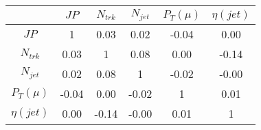 \begin{tabular}{|c|c|c|c|c|c|} 
\hline
 & $JP$ & $N_{trk}$ & $N_{jet}$ & $P_{T} (\mu)$ & $\eta (jet)$ \\ \hline
$JP$ & 1 & 0.03 & 0.02 & -0.04 & 0.00 \\
$N_{trk}$ & 0.03 & 1 & 0.08 & 0.00 & -0.14 \\
$N_{jet}$ & 0.02 & 0.08 & 1 & -0.02 & -0.00 \\
$P_{T} (\mu)$ & -0.04 & 0.00 & -0.02 & 1 & 0.01 \\
$\eta (jet)$ & 0.00 & -0.14 & -0.00 & 0.01 & 1 \\
\hline 
\end{tabular} 


